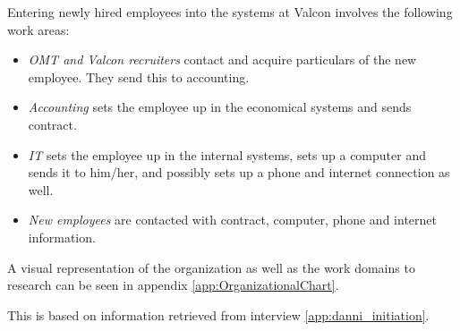 Entering newly hired employees into the systems at Valcon involves the following work areas:

\begin{itemize}
\item \emph{OMT and Valcon recruiters} contact and acquire particulars of the new employee. They send this to accounting.
\item \emph{Accounting} sets the employee up in the economical systems and sends contract.
\item \emph{IT} sets the employee up in the internal systems, sets up a computer and sends it to him/her, and possibly sets up a phone and internet connection as well.
\item \emph{New employees} are contacted with contract, computer, phone and internet information. 
\end{itemize}

A visual representation of the organization as well as the work domains to research can be seen in appendix \ref{app:OrganizationalChart}.

This is based on information retrieved from interview \ref{app:danni_initiation}.